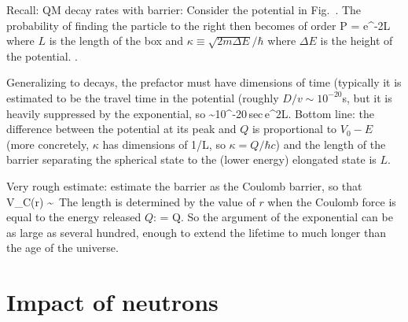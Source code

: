 \documentclass[11pt]{book}
\begin{document}
Recall: 
QM decay rates with barrier: Consider the potential in Fig.~.
The probability of finding the particle to the right then becomes of order
\be
P = e^{-2\kappa L}\ee
where $L$ is the length of the box and $\kappa \equiv \sqrt{2m\Delta E}/\hbar$ where $\Delta E $ is the height of the potential. .


Generalizing to decays, the prefactor must have dimensions of time (typically it is estimated to be the travel time in the potential (roughly $D/v\sim 10^{-20}$s, but it is heavily suppressed by the exponential, so
\be
\tau \sim 10^{-20}\,{\rm sec}\,e^{2\kappa L}.\ee
 Bottom line: the difference between the potential at its peak and $Q$ is proportional to $V_0-E$ (more concretely, $\kappa$ has dimensions of 1/L, so $\kappa = Q/\hbar c$) and the length of the barrier separating the spherical state to the (lower energy) elongated state is $L$. 

Very rough estimate: estimate the barrier as the Coulomb barrier, so that 
\be
V_C(r) \sim\,
\ee
The length is determined by the value of $r$ when the Coulomb force is equal to the energy released $Q$:
\be
  = Q.\ee
 So the argument of the exponential can be as large as several hundred,
 enough to extend the lifetime to much longer than the age of the universe.


\section{Impact of neutrons}
\end{document}
